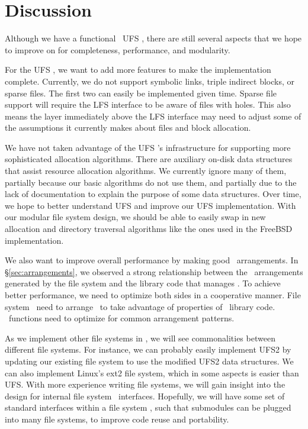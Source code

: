 \section {Discussion}
\label{sec:discussion}

Although we have a functional \Kudos\ UFS \module, there are still several
aspects that we hope to improve on for completeness, performance, and
modularity.

For the UFS \module, we want to add more features to make the implementation
complete. Currently, we do not support symbolic links, triple indirect blocks,
or sparse files. The first two can easily be implemented given time. Sparse
file support will require the LFS interface to be aware of files with holes.
This also means the layer immediately above the LFS interface may need to
adjust some of the assumptions it currently makes about files and block
allocation.

We have not taken advantage of the UFS \module's infrastructure for supporting
more sophisticated allocation algorithms. There are auxiliary on-disk data
structures that assist resource allocation algorithms. We currently ignore many
of them, partially because our basic algorithms do not use them, and partially
due to the lack of documentation to explain the purpose of some data
structures. Over time, we hope to better understand UFS and improve our UFS
implementation. With our modular file system design, we should be able to
easily swap in new allocation and directory traversal algorithms like the ones
used in the FreeBSD implementation.

We also want to improve overall performance by making good
\chdesc\ arrangements. In \S\ref{sec:arrangements}, we observed a
strong relationship between the \chdesc\ arrangements generated by the file
system and the library code that manages \chdescs. To achieve better
performance, we need to optimize both sides in a cooperative manner. File
system \modules\ need to arrange \chdescs\ to take advantage of properties of
\chdesc\ library code. \Chdesc\ functions need to optimize for common
arrangement patterns.

As we implement other file systems in \Kudos, we will see commonalities between
different file systems. For instance, we can probably easily implement UFS2 by
updating our existing file system to use the modified UFS2 data structures.
We can also implement Linux's ext2 file system, which in some aspects is
easier than UFS. With more experience writing file systems, we will
gain insight into the design for internal file system \module\ interfaces.
Hopefully, we will have some set of standard interfaces within a file system
\module, such that submodules can be plugged into many file systems, to improve
code reuse and portability.

